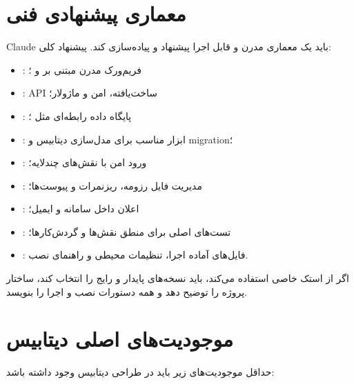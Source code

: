 \documentclass[12pt,a4paper]{article}
\begin{document}
\section{معماری پیشنهادی فنی}
Claude باید یک معماری مدرن و قابل اجرا پیشنهاد و پیاده‌سازی کند. پیشنهاد کلی:
\begin{itemize}
\item {}: فریم‌ورک مدرن مبتنی بر  و ؛
\item {}: API ساخت‌یافته، امن و ماژولار؛
\item {}: پایگاه داده رابطه‌ای مثل ؛
\item {}: ابزار مناسب برای مدل‌سازی دیتابیس و migration؛
\item {}: ورود امن با نقش‌های چندلایه؛
\item {}: مدیریت فایل رزومه، ریزنمرات و پیوست‌ها؛
\item {}: اعلان داخل سامانه و ایمیل؛
\item {}: تست‌های اصلی برای منطق نقش‌ها و گردش‌کارها؛
\item {}: فایل‌های آماده اجرا، تنظیمات محیطی و راهنمای نصب.
\end{itemize}

اگر  از استک خاصی استفاده می‌کند، باید نسخه‌های پایدار و رایج را انتخاب کند، ساختار پروژه را توضیح دهد و همه دستورات نصب و اجرا را بنویسد.

\section{موجودیت‌های اصلی دیتابیس}
حداقل موجودیت‌های زیر باید در طراحی دیتابیس وجود داشته باشد:
\end{document}
